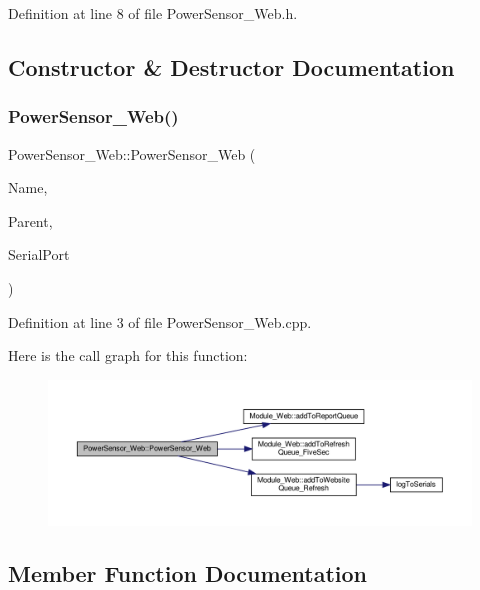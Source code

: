 Definition at line 8 of file Power\+Sensor\+\_\+\+Web.\+h.



\subsection{Constructor \& Destructor Documentation}
\mbox{\label{class_power_sensor___web_a7557ab09526b936ca15b5dc4ecb6f1ef}} 
\subsubsection{\texorpdfstring{Power\+Sensor\+\_\+\+Web()}{PowerSensor\_Web()}}
{\footnotesize\ttfamily Power\+Sensor\+\_\+\+Web\+::\+Power\+Sensor\+\_\+\+Web (\begin{DoxyParamCaption}\item[{const \+\_\+\+\_\+\+Flash\+String\+Helper $\ast$}]{Name,  }\item[{\hyperlink{class_module___web}{Module\+\_\+\+Web} $\ast$}]{Parent,  }\item[{Hardware\+Serial $\ast$}]{Serial\+Port }\end{DoxyParamCaption})}



Definition at line 3 of file Power\+Sensor\+\_\+\+Web.\+cpp.

Here is the call graph for this function\+:
\nopagebreak
\begin{figure}[H]
\begin{center}
\leavevmode
\includegraphics[width=350pt]{class_power_sensor___web_a7557ab09526b936ca15b5dc4ecb6f1ef_cgraph}
\end{center}
\end{figure}


\subsection{Member Function Documentation}
\mbox{\label{class_power_sensor___web_a30ec071067c612277dd426f96cc2f1a3}} 
